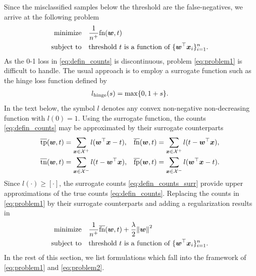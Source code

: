 Since the misclassified samples below the threshold are the false-negatives, we arrive at the following problem
\begin{equation}\label{eq:problem1}
  \begin{aligned}
    \operatorname*{minimize}_{}
    & \quad \frac{1}{n^{+}}\textnormal{fn}(\bm{w}, t)\\
    \operatorname{subject\ to}
    & \quad \text{threshold } t \text{ is a function of }\{\bm{w}^\top \bm{x}_i\}_{i = 1}^n.
  \end{aligned}
\end{equation}
As the 0-1 loss in \eqref{eq:defin_counts} is discontinuous, problem \eqref{eq:problem1} is difficult to handle. The usual approach is to employ a surrogate function such as the hinge loss function defined by
\begin{equation}\label{eq:defin_surrogate}
  \begin{aligned}
    l_{\rm hinge}(s) & =\max\Brac[c]{0, 1 + s}.\\
  \end{aligned}
\end{equation}
In the text below, the symbol $l$ denotes any convex non-negative non-decreasing function with $l(0) = 1$. Using the surrogate function, the counts \eqref{eq:defin_counts} may be approximated by their surrogate counterparts
\begin{equation}\label{eq:defin_counts_surr}
  \begin{aligned}
    \overline{\textnormal{tp}}(\bm{w}, t) & = \sum_{\bm{x} \in \mathcal{X}^+}l(\bm{w}^\top \bm{x}-t), &
    \overline{\textnormal{fn}}(\bm{w}, t) & = \sum_{\bm{x} \in \mathcal{X}^+}l(t - \bm{w}^\top \bm{x}), \\
    \overline{\textnormal{tn}}(\bm{w}, t) & = \sum_{\bm{x} \in \mathcal{X}^-}l(t - \bm{w}^\top \bm{x}),&
    \overline{\textnormal{fp}}(\bm{w}, t) & = \sum_{\bm{x} \in \mathcal{X}^-}l(\bm{w}^\top \bm{x}-t).
  \end{aligned}
\end{equation}
Since $l(\cdot)\ge[\cdot]$, the surrogate counts \eqref{eq:defin_counts_surr} provide upper approximations of the true counts \eqref{eq:defin_counts}. Replacing the counts in \eqref{eq:problem1} by their surrogate counterparts and adding a regularization results in
\begin{equation}\label{eq:problem2}
  \begin{aligned}
    \minimize
    & \quad \frac{1}{n^{+}}\fns(\bm{w}, t) + \frac{\lambda}{2}\norm{\bm{w}}^2 \\
    \st
    & \quad \text{threshold } t \text{ is a function of }\{\bm{w}^\top \bm{x}_i\}_{i = 1}^n.
  \end{aligned}
\end{equation}
In the rest of this section, we list formulations which fall into the framework of \eqref{eq:problem1} and \eqref{eq:problem2}.

